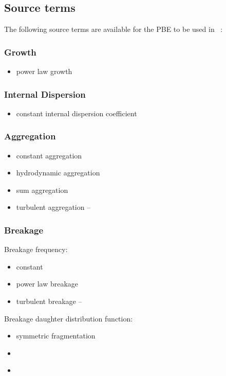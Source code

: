 \subsection{Source terms}
The following source terms are available for the PBE to be used in \fluidity\ :
\subsubsection{Growth}
\begin{itemize}
\item power law growth
\end{itemize}
\subsubsection{Internal Dispersion}
\begin{itemize}
\item constant internal dispersion coefficient
\end{itemize}
\subsubsection{Aggregation}
\begin{itemize}
\item constant aggregation
\item hydrodynamic aggregation
\item sum aggregation
\item turbulent aggregation -- \citet{laakkonen2007modelling}
\end{itemize}
\subsubsection{Breakage}
Breakage frequency:
\begin{itemize}
\item constant
\item power law breakage
\item turbulent breakage -- \citet{laakkonen2007modelling}
\end{itemize}

Breakage daughter distribution function:
\begin{itemize}
\item symmetric fragmentation
\item \citet{mccoymadras2003analytical}
\item \citet{laakkonen2007modelling}
\end{itemize}

